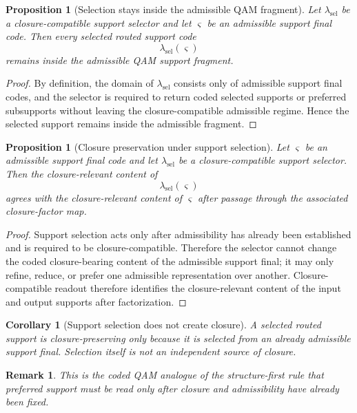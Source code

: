 \documentclass[12pt,a4paper]{article}
\newtheorem{proposition}[theorem]{Proposition}
\newtheorem{corollary}[theorem]{Corollary}
\newtheorem{remark}[theorem]{Remark}
\begin{document}
\begin{proposition}[Selection stays inside the admissible QAM fragment]
Let $\lambda_{\mathrm{sel}}$ be a closure-compatible support selector and let $\varsigma$ be an admissible support final code. Then every selected routed support code
\[
\lambda_{\mathrm{sel}}(\varsigma)
\]
remains inside the admissible QAM support fragment.
\end{proposition}

\begin{proof}
By definition, the domain of $\lambda_{\mathrm{sel}}$ consists only of admissible support final codes, and the selector is required to return coded selected supports or preferred subsupports without leaving the closure-compatible admissible regime. Hence the selected support remains inside the admissible fragment.
\end{proof}

\begin{proposition}[Closure preservation under support selection]
Let $\varsigma$ be an admissible support final code and let $\lambda_{\mathrm{sel}}$ be a closure-compatible support selector. Then the closure-relevant content of
\[
\lambda_{\mathrm{sel}}(\varsigma)
\]
agrees with the closure-relevant content of $\varsigma$ after passage through the associated closure-factor map.
\end{proposition}

\begin{proof}
Support selection acts only after admissibility has already been established and is required to be closure-compatible. Therefore the selector cannot change the coded closure-bearing content of the admissible support final; it may only refine, reduce, or prefer one admissible representation over another. Closure-compatible readout therefore identifies the closure-relevant content of the input and output supports after factorization.
\end{proof}

\begin{corollary}[Support selection does not create closure]
A selected routed support is closure-preserving only because it is selected from an already admissible support final. Selection itself is not an independent source of closure.
\end{corollary}

\begin{remark}
This is the coded QAM analogue of the structure-first rule that preferred support must be read only after closure and admissibility have already been fixed.
\end{remark}
\end{document}
